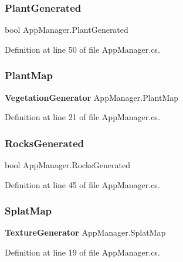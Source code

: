 \mbox{\label{class_app_manager_ac442bd5e3e9a4a1f239e9a720974b5de}} 
\subsubsection{Plant\+Generated}
{\footnotesize\ttfamily bool App\+Manager.\+Plant\+Generated}



Definition at line 50 of file App\+Manager.\+cs.

\mbox{\label{class_app_manager_ac290af948cbe3adb70269566cf651907}} 
\subsubsection{Plant\+Map}
{\footnotesize\ttfamily \textbf{ Vegetation\+Generator} App\+Manager.\+Plant\+Map}



Definition at line 21 of file App\+Manager.\+cs.

\mbox{\label{class_app_manager_acaa1de8f8b2f3156c13cb19059b002c5}} 
\subsubsection{Rocks\+Generated}
{\footnotesize\ttfamily bool App\+Manager.\+Rocks\+Generated}



Definition at line 45 of file App\+Manager.\+cs.

\mbox{\label{class_app_manager_a203e154e32578e259b4f30d11c9986b1}} 
\subsubsection{Splat\+Map}
{\footnotesize\ttfamily \textbf{ Texture\+Generator} App\+Manager.\+Splat\+Map}



Definition at line 19 of file App\+Manager.\+cs.

\mbox{\label{class_app_manager_a7839406f13bada3a48e804af17f6a9ec}} 
